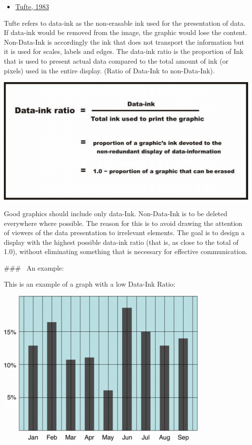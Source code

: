 \documentclass[]{book}
\providecommand{\tightlist}{%
  \setlength{\itemsep}{0pt}\setlength{\parskip}{0pt}}
\theoremstyle{definition}
\theoremstyle{definition}
\theoremstyle{definition}
\theoremstyle{remark}
\begin{document}
\begin{itemize}
\tightlist
\item
  \href{https://www.edwardtufte.com/tufte/books_vdqi}{Tufte, 1983}
\end{itemize}

Tufte refers to data-ink as the non-erasable ink used for the
presentation of data. If data-ink would be removed from the image, the
graphic would lose the content. Non-Data-Ink is accordingly the ink that
does not transport the information but it is used for scales, labels and
edges. The data-ink ratio is the proportion of Ink that is used to
present actual data compared to the total amount of ink (or pixels) used
in the entire display. (Ratio of Data-Ink to non-Data-Ink).

\includegraphics{imgs/data_ink_ratio.jpg}

Good graphics should include only data-Ink. Non-Data-Ink is to be
deleted everywhere where possible. The reason for this is to avoid
drawing the attention of viewers of the data presentation to irrelevant
elements. The goal is to design a display with the highest possible
data-ink ratio (that is, as close to the total of 1.0), without
eliminating something that is necessary for effective communication.

\#\#\#~ An example:

This is an example of a graph with a low Data-Ink Ratio:

\includegraphics{imgs/low_data_ink_ratio.png}
\end{document}
